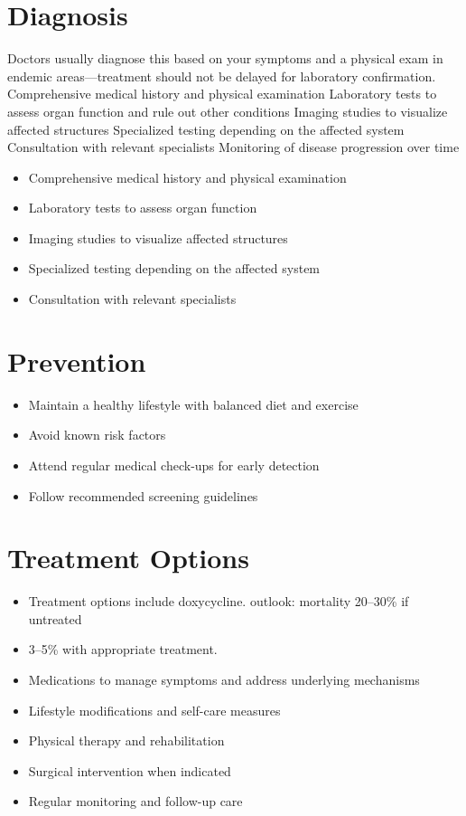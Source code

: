 \section{Diagnosis}
Doctors usually diagnose this based on your symptoms and a physical exam in endemic areas---treatment should not be delayed for laboratory confirmation. Comprehensive medical history and physical examination Laboratory tests to assess organ function and rule out other conditions Imaging studies to visualize affected structures Specialized testing depending on the affected system Consultation with relevant specialists Monitoring of disease progression over time

\begin{itemize}[noitemsep]
  \item Comprehensive medical history and physical examination
  \item Laboratory tests to assess organ function
  \item Imaging studies to visualize affected structures
  \item Specialized testing depending on the affected system
  \item Consultation with relevant specialists
\end{itemize}
\section{Prevention}
\begin{itemize}[noitemsep]
  \item Maintain a healthy lifestyle with balanced diet and exercise
  \item Avoid known risk factors
  \item Attend regular medical check-ups for early detection
  \item Follow recommended screening guidelines
\end{itemize}
\section{Treatment Options}
\begin{itemize}[noitemsep]
  \item Treatment options include doxycycline. outlook: mortality 20--30\% if untreated
  \item 3--5\% with appropriate treatment.
  \item Medications to manage symptoms and address underlying mechanisms
  \item Lifestyle modifications and self-care measures
  \item Physical therapy and rehabilitation
  \item Surgical intervention when indicated
  \item Regular monitoring and follow-up care
\end{itemize}
